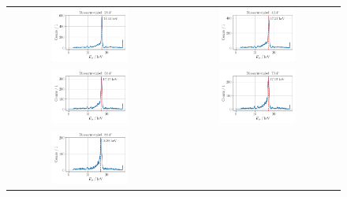 \documentclass[ngerman]{scrartcl}
\begin{document}
\begin{figure}[H]
    \centering
    \begin{tabular}{cc}
        \includegraphics[width=0.48\textwidth]{../plots/energie_spektren_1.pdf} &
        \includegraphics[width=0.48\textwidth]{../plots/energie_spektren_2.pdf}   \\
        \includegraphics[width=0.48\textwidth]{../plots/energie_spektren_3.pdf} &
        \includegraphics[width=0.48\textwidth]{../plots/energie_spektren_4.pdf}   \\
        \includegraphics[width=0.48\textwidth]{../plots/energie_spektren_5.pdf} &

\end{tabular}
\end{figure}
\end{document}
